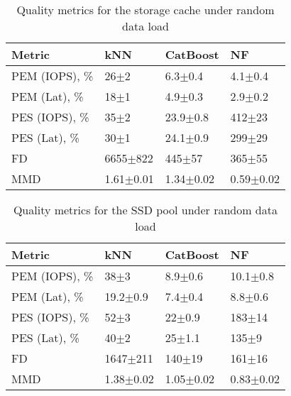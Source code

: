 \begin{table}[t]
\caption{Quality metrics for the storage cache under random data load}
\small
\begin{tabularx}{\linewidth}{X@{}X@{}X@{}X@{}}
\hline
Metric & 
kNN & 
CatBoost &
NF \\
\hline
PEM (IOPS), \%  & 26$\pm$2 & 6.3$\pm$0.4 & 4.1$\pm$0.4 \\
PEM (Lat), \%   & 18$\pm$1   & 4.9$\pm$0.3 & 2.9$\pm$0.2 \\
PES (IOPS), \%  & 35$\pm$2 & 23.9$\pm$0.8 & 412$\pm$23 \\
PES (Lat), \%   & 30$\pm$1   & 24.1$\pm$0.9 & 299$\pm$29 \\
FD              & 6655$\pm$822 & 445$\pm$57   & 365$\pm$55 \\
MMD             & 1.61$\pm$0.01 & 1.34$\pm$0.02 & 0.59$\pm$0.02 \\
\hline
\end{tabularx}
\label{tab:metrics_cache_rnd}
\end{table}


\begin{table}[t]
\caption{Quality metrics for the SSD pool under random data load}
\small
\begin{tabularx}{\linewidth}{X@{}X@{}X@{}X@{}}
\hline
Metric & 
kNN & 
CatBoost &
NF \\
\hline
PEM (IOPS), \%  & 38$\pm$3        & 8.9$\pm$0.6     & 10.1$\pm$0.8 \\
PEM (Lat), \%   & 19.2$\pm$0.9    & 7.4$\pm$0.4     & 8.8$\pm$0.6 \\
PES (IOPS), \%  & 52$\pm$3        & 22$\pm$0.9      & 183$\pm$14 \\
PES (Lat), \%   & 40$\pm$2        & 25$\pm$1.1      & 135$\pm$9 \\
FD              & 1647$\pm$211    & 140$\pm$19      & 161$\pm$16 \\
MMD             & 1.38$\pm$0.02   & 1.05$\pm$0.02   & 0.83$\pm$0.02 \\
\hline
\end{tabularx}
\label{tab:metrics_ssd_rnd}
\end{table}


